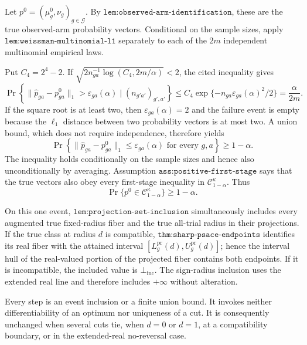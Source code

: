 Let \(p^0=(\mu_g^0,\nu_g)_{g\in\mathcal G}\).  By \(\texttt{lem:observed-arm-identification}\), these are the true observed-arm probability vectors.  Conditional on the sample sizes, apply \(\texttt{lem:weissman-multinomial-l1}\) separately to each of the \(2m\) independent multinomial empirical laws.

Put \(C_4=2^4-2\).  If
\(\sqrt{2n_{ga}^{-1}\log(C_4,2m/\alpha)}<2\), the cited inequality gives
\[
 \Pr\!\left\{\|\widehat p_{ga}-p^0_{ga}\|_1>
 \varepsilon_{ga}(\alpha)\mid(n_{g'a'})_{g',a'}\right\}
 \le C_4\exp\{-n_{ga}\varepsilon_{ga}(\alpha)^2/2\}
 =\frac{\alpha}{2m}.
\]
If the square root is at least two, then \(\varepsilon_{ga}(\alpha)=2\) and the failure event is empty because the \(\ell_1\) distance between two probability vectors is at most two.  A union bound, which does not require independence, therefore yields
\[
 \Pr\!\left\{
 \|\widehat p_{ga}-p^0_{ga}\|_1\le\varepsilon_{ga}(\alpha)
 \text{ for every }g,a
 \right\}\ge1-\alpha.
\]
The inequality holds conditionally on the sample sizes and hence also unconditionally by averaging.  Assumption \(\texttt{ass:positive-first-stage}\) says that the true vectors also obey every first-stage inequality in \(\mathcal C_{1-\alpha}^{\kappa}\).  Thus
\[
 \Pr\{p^0\in\mathcal C_{1-\alpha}^{\kappa}\}\ge1-\alpha.
\]

On this one event, \(\texttt{lem:projection-set-inclusion}\) simultaneously includes every augmented true fixed-radius fiber and the true all-trial radius in their projections.  If the true class at radius \(d\) is compatible, \(\texttt{thm:sharp-psace-endpoints}\) identifies its real fiber with the attained interval
\([L_g^{\mathrm{pr}}(d),U_g^{\mathrm{pr}}(d)]\); hence the interval hull of the real-valued portion of the projected fiber contains both endpoints.  If it is incompatible, the included value is \(\bot_{\mathrm{inc}}\).  The sign-radius inclusion uses the extended real line and therefore includes \(+\infty\) without alteration.

Every step is an event inclusion or a finite union bound.  It invokes neither differentiability of an optimum nor uniqueness of a cut.  It is consequently unchanged when several cuts tie, when \(d=0\) or \(d=1\), at a compatibility boundary, or in the extended-real no-reversal case.